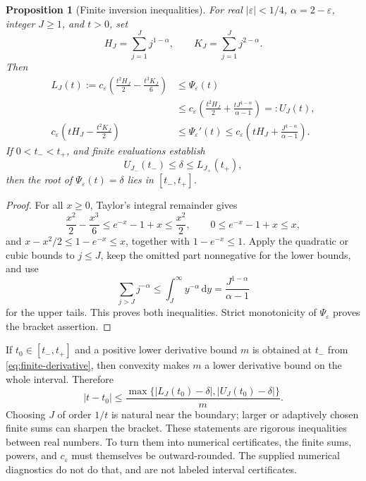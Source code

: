 \documentclass[11pt,a4paper]{article}
\numberwithin{equation}{section}
\newtheorem{proposition}[theorem]{Proposition}
\theoremstyle{definition}
\theoremstyle{remark}
\newcommand{\eps}{\varepsilon}
\newcommand{\dd}{\,\mathrm d}
\begin{document}
\begin{proposition}[Finite inversion inequalities]
\label{prop:finite}
For real \(|\eps|<1/4\), \(\alpha=2-\eps\), integer \(J\ge1\), and
\(t>0\), set
\begin{equation}
 H_J=\sum_{j=1}^Jj^{1-\alpha},\qquad
 K_J=\sum_{j=1}^Jj^{2-\alpha}.
 \label{eq:HK}
\end{equation}
Then
\begin{align}
 L_J(t):=c_\eps\left(\frac{t^2H_J}{2}-\frac{t^3K_J}{6}\right)
 &\le\Psi_\eps(t) \nonumber\\
 &\le c_\eps\left(\frac{t^2H_J}{2}
             +\frac{tJ^{1-\alpha}}{\alpha-1}\right)=:U_J(t),
 \label{eq:finite-bounds}\\
 c_\eps\left(tH_J-\frac{t^2K_J}{2}\right)
 &\le\Psi_\eps'(t)
 \le c_\eps\left(tH_J+\frac{J^{1-\alpha}}{\alpha-1}\right).
 \label{eq:finite-derivative}
\end{align}
If \(0<t_-<t_+\), and finite evaluations establish
\begin{equation}
 U_{J_-}(t_-)\le\delta\le L_{J_+}(t_+),
 \label{eq:root-certificate}
\end{equation}
then the root of \(\Psi_\eps(t)=\delta\) lies in \([t_-,t_+]\).
\end{proposition}
\begin{proof}
For all \(x\ge0\), Taylor's integral remainder gives
\[
 \frac{x^2}{2}-\frac{x^3}{6}\le e^{-x}-1+x\le\frac{x^2}{2},
 \qquad 0\le e^{-x}-1+x\le x,
\]
and
\(x-x^2/2\le1-e^{-x}\le x\), together with \(1-e^{-x}\le1\).
Apply the quadratic or cubic bounds to \(j\le J\), keep the omitted part
nonnegative for the lower bounds, and use
\[
 \sum_{j>J}j^{-\alpha}\le\int_J^\infty y^{-\alpha}\dd y
 =\frac{J^{1-\alpha}}{\alpha-1}
\]
for the upper tails. This proves both inequalities. Strict monotonicity of
\(\Psi_\eps\) proves the bracket assertion.
\end{proof}

If \(t_0\in[t_-,t_+]\) and a positive lower derivative bound \(m\) is
obtained at \(t_-\) from \eqref{eq:finite-derivative}, then convexity makes
\(m\) a lower derivative bound on the whole interval. Therefore
\begin{equation}
 |t-t_0|\le
 \frac{\max\{|L_J(t_0)-\delta|,|U_J(t_0)-\delta|\}}m.
 \label{eq:residual-certificate}
\end{equation}
Choosing \(J\) of order \(1/t\) is natural near the boundary; larger or
adaptively chosen finite sums can sharpen the bracket. These statements are
rigorous inequalities between real numbers. To turn them into numerical
certificates, the finite sums, powers, and \(c_\eps\) must themselves be
outward-rounded. The supplied numerical diagnostics do not do that, and are
not labeled interval certificates.
\end{document}
